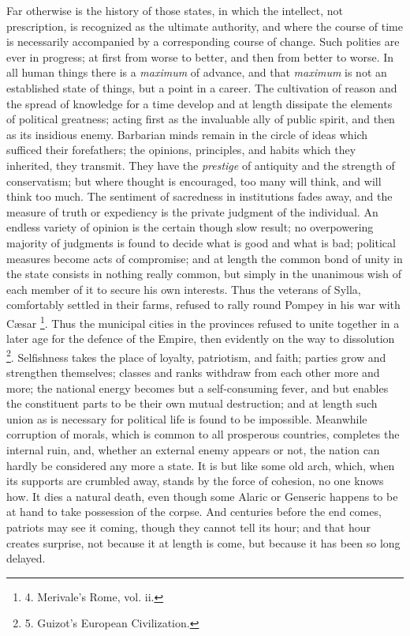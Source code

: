 Far otherwise is the history
of those states, in which the intellect, not prescription, is
recognized as the ultimate authority, and where the course of time is
necessarily accompanied by a corresponding course of change. Such
polities are ever in progress; at first from worse to better, and then
from better to worse. In all human things there is a \emph{maximum} of
advance, and that \emph{maximum} is not an established state of
things, but a point in a career. The cultivation of reason and the
spread of knowledge for a time develop and at length dissipate the
elements of political greatness; acting first as the invaluable ally
of public spirit, and then as its insidious enemy. Barbarian minds
remain in the circle of ideas which sufficed their forefathers; the
opinions, principles, and habits which they inherited, they transmit.
They have the \emph{prestige} of antiquity and the strength of
conservatism; but where thought is encouraged, too many will think,
and will think too much. The sentiment of sacredness in institutions
fades away, and the measure of truth or expediency is the private
judgment of the individual. An endless variety of opinion is the
certain though slow result; no overpowering majority of judgments is
found to decide what is good and what is bad; political measures
become acts of compromise; and at length the common bond of unity in
the state consists in nothing really common, but simply in the
unanimous wish of each member of it to secure his own interests. Thus
the veterans of Sylla, comfortably settled in their farms, refused to
rally round Pompey in his war with Cæsar \footnote{4.
Merivale's Rome, vol. ii.}. Thus the municipal cities in the provinces refused to unite
together in a later age for the defence of the Empire, then evidently
on the way to dissolution \footnote{5.
Guizot's European Civilization.}.
Selfishness takes the place of loyalty, patriotism, and faith; parties
grow and strengthen themselves; classes and ranks withdraw from each
other more and more; the national energy becomes but a self-consuming
fever, and but enables the constituent parts to be their own mutual
destruction; and at length such union as is necessary for political
life is found to be impossible. Meanwhile corruption of morals, which
is common to all prosperous countries, completes the internal ruin,
and, whether an external enemy appears or not, the nation can hardly
be considered any more a state. It is but like some old arch, which,
when its supports are crumbled away, stands by the force of cohesion,
no one knows how. It dies a natural death, even though some Alaric or
Genseric happens to be at hand to take possession of the corpse. And
centuries before the end comes, patriots may see it coming, though
they cannot tell its hour; and that hour creates surprise, not because
it at length is come, but because it has been so long delayed.

